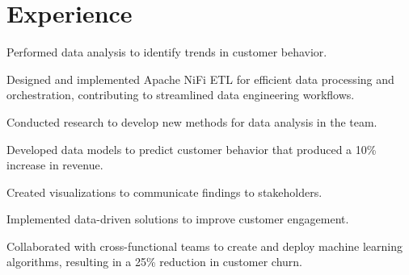 \documentclass[]{plushcv}
\begin{document}
\begin{minipage}[t]{0.70\textwidth} 


\sectionsep

\section{Experience}



\begin{tightemize}
\sectionsep
\sectionsep
\item Performed data analysis to identify trends in customer behavior.
\item Designed and implemented Apache NiFi ETL for efficient data processing and orchestration, contributing to streamlined data engineering workflows.
\item Conducted research to develop new methods for data analysis in the team.
\item Developed data models to predict customer behavior that produced a 10\% increase in revenue.
\item Created visualizations to communicate findings to stakeholders.
\item Implemented data-driven solutions to improve customer engagement.
\item Collaborated with cross-functional teams to create and deploy machine learning algorithms, resulting in a 25\% reduction in customer churn.


\end{tightemize}
\sectionsep


\end{minipage}
\end{document}
